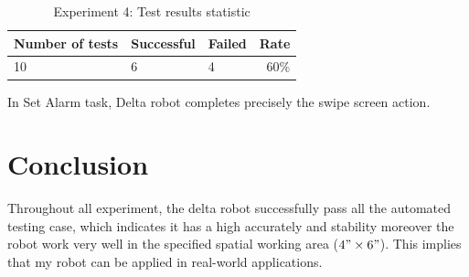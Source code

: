 \begin{table}[H]
	\centering
	\caption{Experiment 4: Test results statistic}	
	\label{tab:exp4_result_stat}
	\begin{tabular}{|lll|r|}
		\hline
		\textbf{Number of tests} & \textbf{Successful} & \textbf{Failed} & \textbf{Rate} \\
		\hline
		10 & 6 & 4 & 60$\%$\\
		\hline
	\end{tabular}
\end{table}

In Set Alarm task, Delta robot completes precisely the swipe screen action.

\section{Conclusion}
Throughout all experiment, the delta robot successfully pass all the automated testing case, which indicates it has a high accurately and stability moreover the robot work very well in the specified spatial working area ($4"\times6"$). This implies that my robot can be applied in real-world applications.

